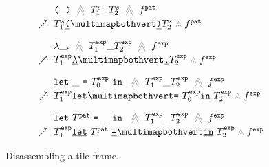 \begin{figure}
  \newcommand{\du}{\nearrow}
  \newcommand{\vstretch}{\vspace{0.3cm}}
  \[
    \arraycolsep=3pt
    \def\arraystretch{1.2}
    \begin{array}{rl}
      & \tframelit{
        \sparen{\_}
      }{
        \tframelit{\tiles^s_1\_\tiles^s_2}{\tfrelem^{\pat}}
      } \\
      \du
      & \zipper{
        \pointing{\tiles^s_1\shardlit{\texttt{(}}~}{~\shardlit{\texttt{)}}\tiles^s_2}
      }{
        \tfrelem^{\pat}
      } \vstretch \\

      & \tframelit{
        \slam{\_}{}
      }{
        \tframelit{\tiles^{\expr}_1\_\tiles^{\expr}_2}{\tfrelem^{\expr}}
      } \\
      \du
      & \zipper{
        \pointing{\tiles^{\expr}_1\shardlit{\lambda}~}{~\shardlit{\texttt{.}}\tiles^{\expr}_2}
      }{
        \tfrelem^{\expr}
      } \vstretch \\

      & \tframelit{
        \slet{\_}{\tiles^{\expr}_0}{}
      }{
        \tframelit{\tiles^{\expr}_1\_\tiles^{\expr}_2}{\tfrelem^{\expr}}
      } \\
      \du
      & \zipper{
        \pointing{
          \tiles^{\expr}_1\shardlit{\texttt{let}}~
        }{
          ~\shardlit{\texttt{=}}~\tiles^{\expr}_0\shardlit{\texttt{in}}~\tiles^{\expr}_2
        }
      }{
        \tfrelem^{\expr}
      } \vstretch \\

      & \tframelit{
        \slet{\tiles^{\pat}}{\_}{}
      }{
        \tframelit{\tiles^{\expr}_1\_\tiles^{\expr}_2}{\tfrelem^{\expr}}
      } \\
      \du
      & \zipper{
        \pointing{
          \tiles^{\expr}_1\shardlit{\texttt{let}}~\tiles^{\pat}~\shardlit{\texttt{=}}~
        }{
          ~\shardlit{\texttt{in}}~\tiles^{\expr}_2
        }
      }{
        \tfrelem^{\expr}
      }
  \end{array}\]
  \caption{
    Disassembling a tile frame. 
  }
  \label{fig:disassemble-tile}
\end{figure}